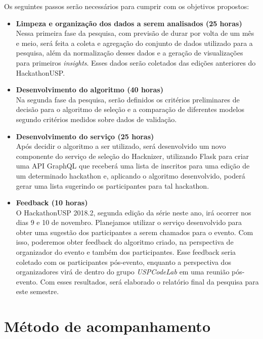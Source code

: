 \documentclass[10pt,twoside,a4paper]{article}
\begin{document}
  Os seguintes passos serão necessários para cumprir com os objetivos propostos:

  \begin{itemize}
    \item \textbf{Limpeza e organização dos dados a serem analisados (25 horas)} \\
        Nessa primeira fase da pesquisa, com previsão de durar por volta de um mês e meio, será feita a coleta e agregação do conjunto de dados utilizado para a pesquisa, além da normalização desses dados e a geração de visualizações para primeiros \textit{insights}. Esses dados serão coletados das edições anteriores do HackathonUSP.
    
    \item \textbf{Desenvolvimento do algoritmo (40 horas)} \\
        Na segunda fase da pesquisa, serão definidos os critérios preliminares de decisão para o algoritmo de seleção e a comparação de diferentes modelos segundo critérios medidos sobre dados de validação.
          
    \item \textbf{Desenvolvimento do serviço (25 horas)} \\
        Após decidir o algoritmo a ser utilizado, será desenvolvido um novo componente do serviço de seleção do Hacknizer, utilizando Flask para criar uma API GraphQL  que receberá uma lista de inscritos para uma edição de um determinado hackathon e, aplicando o algoritmo desenvolvido, poderá gerar uma lista sugerindo os participantes para tal hackathon. 
    
    \item \textbf{Feedback (10 horas)} \\
        O HackathonUSP 2018.2, segunda edição da série neste ano, irá ocorrer nos dias 9 e 10 de novembro. Planejamos utilizar o serviço desenvolvido para obter uma sugestão dos participantes a serem chamados para o evento. Com isso, poderemos obter feedback do algoritmo criado, na perspectiva de organizador do evento e também dos participantes. Esse feedback seria coletado com os participantes pós-evento, enquanto a perspectiva dos organizadores virá de dentro do grupo \textit{USPCodeLab} em uma reunião pós-evento. Com esses resultados, será elaborado o relatório final da pesquisa para este semestre.

  \end{itemize}

\section{Método de acompanhamento}
\end{document}
